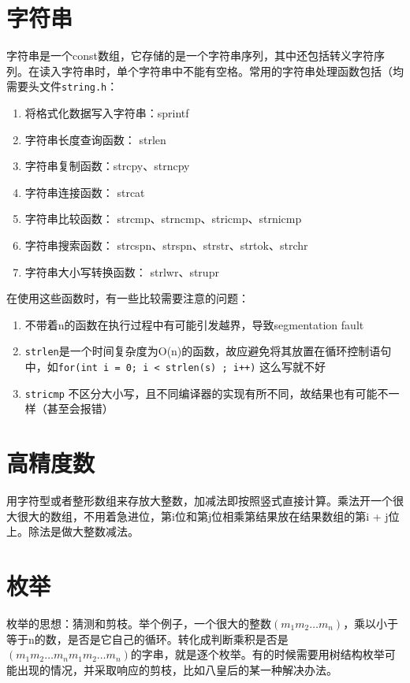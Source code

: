 \documentclass[]{report}
\begin{document}
	\section{字符串}
		字符串是一个const数组，它存储的是一个字符串序列，其中还包括转义字符序列。在读入字符串时，单个字符串中不能有空格。常用的字符串处理函数包括（均需要头文件\texttt{string.h}：
		\begin{enumerate}
			\item 将格式化数据写入字符串：sprintf
			\item 字符串长度查询函数： strlen
			\item 字符串复制函数：strcpy、strncpy
			\item 字符串连接函数： strcat
			\item 字符串比较函数： strcmp、strncmp、stricmp、strnicmp
			\item 字符串搜索函数： strcspn、strspn、strstr、strtok、strchr
			\item 字符串大小写转换函数： strlwr、strupr
		\end{enumerate}
		在使用这些函数时，有一些比较需要注意的问题：
		\begin{enumerate}
			\item 不带着n的函数在执行过程中有可能引发越界，导致segmentation fault
			\item \verb|strlen|是一个时间复杂度为O(n)的函数，故应避免将其放置在循环控制语句中，如\newline\verb|for(int i = 0; i < strlen(s) ; i++)| 这么写就不好
			\item \verb|stricmp| 不区分大小写，且不同编译器的实现有所不同，故结果也有可能不一样（甚至会报错）
		\end{enumerate}
	\section{高精度数}
		用字符型或者整形数组来存放大整数，加减法即按照竖式直接计算。乘法开一个很大很大的数组，不用着急进位，第i位和第j位相乘第结果放在结果数组的第i + j位上。除法是做大整数减法。
	\section{枚举}
		枚举的思想：猜测和剪枝。举个例子，一个很大的整数$(m_1m_2\dots m_n)$，乘以小于等于n的数，是否是它自己的循环。转化成判断乘积是否是$(m_1m_2\dots m_nm_1m_2\dots m_n)$的字串，就是逐个枚举。有的时候需要用树结构枚举可能出现的情况，并采取响应的剪枝，比如八皇后的某一种解决办法。
\end{document}
